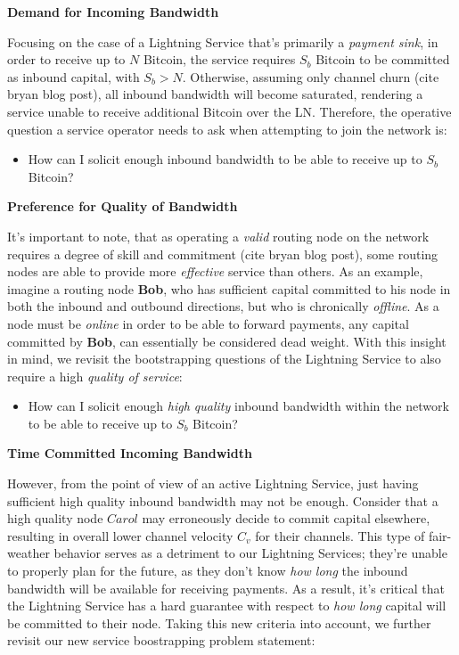 \documentclass[10pt,a4paper]{article}
\theoremstyle{definition}
\begin{document}
\begin{center}
	\textbf{Demand for Incoming Bandwidth}
\end{center}

Focusing on the case of a Lightning Service that's primarily a \emph{payment
sink}, in order to receive up to $N$ Bitcoin, the service requires $S_b$
Bitcoin to be committed as inbound capital, with $S_b > N$. Otherwise, assuming
only channel churn (cite bryan blog post), all inbound bandwidth will become
saturated, rendering a service unable to receive additional Bitcoin over the
LN. Therefore, the operative question a service operator needs to ask when
attempting to join the network is: 

\begin{itemize}
        \item How can I solicit enough inbound bandwidth to be able to receive up to $S_b$ Bitcoin? 
\end{itemize}


\begin{center}
	\textbf{Preference for Quality of Bandwidth}
\end{center}

It's important to note, that as operating a \emph{valid} routing node on the
network requires a degree of skill and commitment (cite bryan blog post), some
routing nodes are able to provide more \emph{effective} service than others.
As an example, imagine a routing node \textbf{Bob}, who has sufficient capital
committed to his node in both the inbound and outbound directions, but who is
chronically \emph{offline}. As a node must be \emph{online} in order to be able
to forward payments, any capital committed by \textbf{Bob}, can essentially be
considered dead weight. With this insight in mind, we revisit the bootstrapping
questions of the Lightning Service to also require a high \emph{quality of
service}:

\begin{itemize}
        \item How can I solicit enough \emph{high quality} inbound bandwidth
            within the network to be able to receive up to $S_b$ Bitcoin? 
\end{itemize}

\begin{center}
	\textbf{Time Committed Incoming Bandwidth}
\end{center}


However, from the point of view of an active Lightning Service, just having
sufficient high quality inbound bandwidth may not be enough. Consider that a
high quality node $Carol$ may erroneously decide to commit capital elsewhere,
resulting in overall lower channel velocity $C_v$ for their channels. This
type of fair-weather behavior serves as a detriment to our Lightning Services;
they're unable to properly plan for the future, as they don't know \emph{how
long} the inbound bandwidth will be available for receiving payments. As a
result, it's critical that the Lightning Service has a hard guarantee with
respect to \emph{how long} capital will be committed to their node. Taking this
new criteria into account, we further revisit our new service boostrapping
problem statement: 
\end{document}

